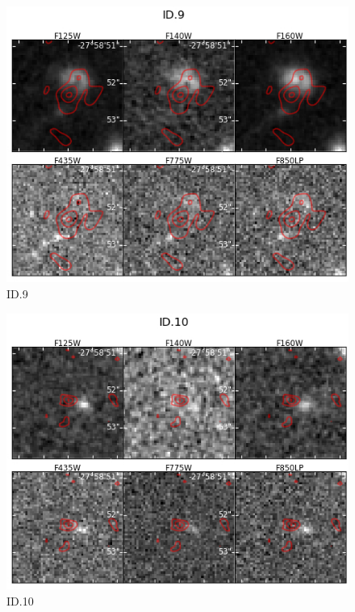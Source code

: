 \begin{figure}[tbp]
\centering \includegraphics[width=160mm]{Matched/ASPECS_Cutout_8.jpg}
\caption{ID.9}
\label{fig:Match_Three}
\end{figure}

\begin{figure}[tbp]
\centering \includegraphics[width=160mm]{Matched/ASPECS_Cutout_9.jpg}
\caption{ID.10}
\label{fig:Match_Three}
\end{figure}


